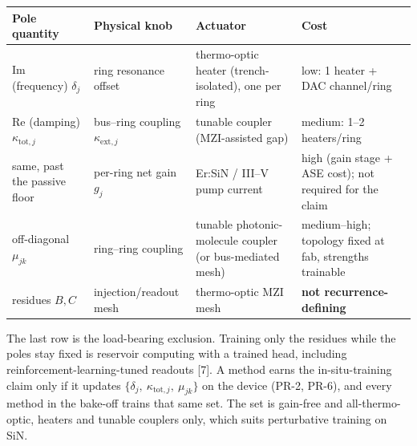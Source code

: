 \documentclass[
  10pt,
]{article}
\newcounter{none} %
\begin{document}
{\def\LTcaptype{none} %
\begin{longtable}[]{@{}
  >{\raggedright\arraybackslash}p{}
  >{\raggedright\arraybackslash}p{}
  >{\raggedright\arraybackslash}p{}
  >{\raggedright\arraybackslash}p{}@{}}
\toprule\noalign{}
\begin{minipage}[b]{\linewidth}\raggedright
Pole quantity
\end{minipage} & \begin{minipage}[b]{\linewidth}\raggedright
Physical knob
\end{minipage} & \begin{minipage}[b]{\linewidth}\raggedright
Actuator
\end{minipage} & \begin{minipage}[b]{\linewidth}\raggedright
Cost
\end{minipage} \\
\midrule\noalign{}
\endhead
\bottomrule\noalign{}
\endlastfoot
\(\mathrm{Im}\) (frequency) \(\delta_j\) & ring resonance offset &
thermo-optic heater (trench-isolated), one per ring & low: 1 heater +
DAC channel/ring \\
\(\mathrm{Re}\) (damping) \(\kappa_{\mathrm{tot},j}\) & bus--ring
coupling \(\kappa_{\mathrm{ext},j}\) & tunable coupler (MZI-assisted
gap) & medium: 1--2 heaters/ring \\
same, past the passive floor & per-ring net gain \(g_j\) & Er:SiN /
III--V pump current & high (gain stage + ASE cost); not required for the
claim \\
off-diagonal \(\mu_{jk}\) & ring--ring coupling & tunable
photonic-molecule coupler (or bus-mediated mesh) & medium--high;
topology fixed at fab, strengths trainable \\
residues \(B, C\) & injection/readout mesh & thermo-optic MZI mesh &
\textbf{not recurrence-defining} \\
\end{longtable}
}

The last row is the load-bearing exclusion. Training only the residues
while the poles stay fixed is reservoir computing with a trained head,
including reinforcement-learning-tuned readouts {[}7{]}. A method earns
the in-situ-training claim only if it updates
\(\{\delta_j,\ \kappa_{\mathrm{tot},j},\ \mu_{jk}\}\) on the device
(PR-2, PR-6), and every method in the bake-off trains that same set. The
set is gain-free and all-thermo-optic, heaters and tunable couplers
only, which suits perturbative training on SiN.
\end{document}
